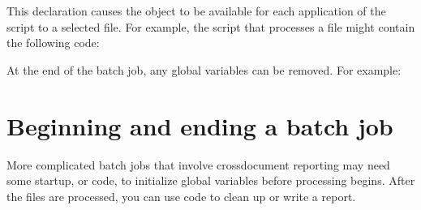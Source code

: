 \documentclass[letterpaper,12pt,english,openany,oneside]{sphinxmanual}
\begin{document}
\begin{sphinxVerbatim}[commandchars=\\\{\}]
   
   
\end{sphinxVerbatim}

This declaration causes the  object to be available for each application of the script to a selected file. For example, the script that processes a file might contain the following code:

\begin{sphinxVerbatim}[commandchars=\\\{\}]
\end{sphinxVerbatim}

At the end of the batch job, any global variables can be removed. For example:

\begin{sphinxVerbatim}[commandchars=\\\{\}]
 
\end{sphinxVerbatim}


\section{Beginning and ending a batch job}
\label{\detokenize{index:beginning-and-ending-a-batch-job}}
More complicated batch jobs that involve cross\sphinxhyphen{}document reporting may need some start\sphinxhyphen{}up, or  code, to initialize global variables before processing begins. After the files are processed, you can use  code to clean up or write a report.
\end{document}
